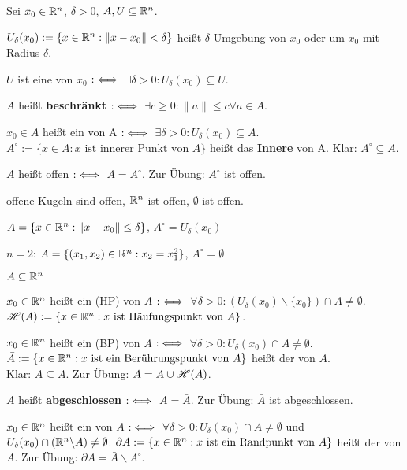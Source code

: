 \documentclass[a4paper,twoside,DIV15,BCOR12mm,chapterprefix=true,headings=twolinechapter]{scrbook}
\begin{document}
\begin{definition}
Sei $x_0 \in \mathbb{R}^n$, $\delta > 0$, $A, U\subseteq \mathbb{R}^n$.
\begin{liste}
 \item $U_\delta(x_0) := \{ x \in \mathbb{R}^n: \|x-x_0\|<\delta\}$ heißt $\delta$-Umgebung von $x_0$ oder  um $x_0$ mit Radius $\delta$.
 \item $U$ ist eine  von $x_0$ $:\iff$ $\exists \delta > 0 : U_\delta(x_0) \subseteq U$.
 \item {}$A$ heißt \textbf{beschränkt} $:\iff$ $\exists c \ge 0: \|a\|\le c \forall a\in A$.
 \item $x_0\in A$ heißt ein  von A $:\iff$ $\exists \delta>0: U_\delta(x_0) \subseteq A$. \\
   $A^\circ:=\{ x\in A: x \text{ ist innerer Punkt von }A\}$ heißt das \textbf{Innere} von A. Klar: $A^\circ\subseteq A.$
 \item $A$ heißt offen $:\iff$ $A=A^\circ$. Zur Übung: $A^\circ$ ist offen.
\end{liste}
\end{definition}

\begin{beispiele}
 \item offene Kugeln sind offen, $\mathbb{R}^n$ ist offen, $\emptyset$ ist offen.
 \item $A=\{x\in\mathbb{R}^n: \|x-x_0\|\le \delta\}$, $A^\circ = U_\delta(x_0)$
 \item $n=2$: $A=\{(x_1,x_2)\in\mathbb{R}^n: x_2 = x_1^2\}$, $A^\circ=\emptyset$
\end{beispiele}

\begin{definition}
 $A\subseteq \mathbb{R}^n$
 \begin{liste}
 \item $x_0\in \mathbb{R}^n$ heißt ein  (HP) von $A$ $:\iff$ $\forall \delta > 0: (U_\delta(x_0) \backslash \{x_0\}) \cap A \ne \emptyset$. $\mathscr{H}(A) := \{ x\in\mathbb{R}^n: x \text{ ist Häufungspunkt von } A\}$.
 \item  $x_0\in\mathbb{R}^n$ heißt ein  (BP) von $A$ $:\iff$ $\forall\delta>0: U_\delta(x_0) \cap A \ne \emptyset$. $\bar{A}:=\{x\in\mathbb{R}^n: x \text{ ist ein Berührungspunkt von } A\}$ heißt der  von $A$.\\
 Klar: $A\subseteq\bar{A}$. Zur Übung: $\bar{A} = A \cup \mathscr{H}(A)$.
 \item {}$A$ heißt \textbf{abgeschlossen} $:\iff$ $A=\bar{A}$. Zur Übung: $\bar{A}$ ist abgeschlossen.
 \item $x_0\in\mathbb{R}^n$ heißt ein  von $A$ $:\iff$ $\forall\delta>0: U_\delta(x_0) \cap A \ne \emptyset$ und $U_\delta(x_0) \cap (\mathbb{R}^n\backslash A) \ne \emptyset$. $\partial A := \{x\in\mathbb{R}^n: x \text{ ist ein Randpunkt von } A \}$ heißt der  von $A$. Zur Übung: $\partial A = \bar{A}\backslash A^\circ$.
 \end{liste}
\end{definition}
\end{document}
